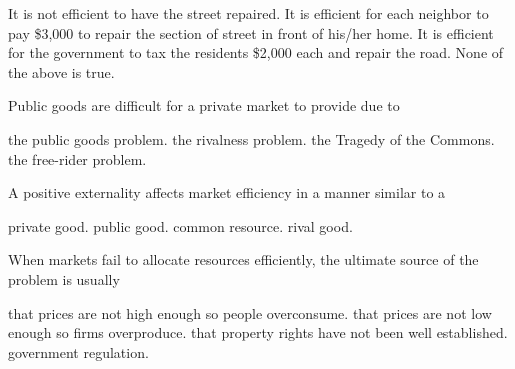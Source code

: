 \documentclass[addpoints,11pt]{exam}
\theoremstyle{definition}
\begin{document}
\begin{questions}
\begin{choices}
	\choice It is not efficient to have the street repaired.
	\choice It is efficient for each neighbor to pay \$3,000 to repair the section of street in front of his/her home.
	\CorrectChoice It is efficient for the government to tax the residents \$2,000 each and repair the road.
	\choice None of the above is true.
\end{choices}

\question Public goods are difficult for a private market to provide due to 

\begin{choices}
	\choice the public goods problem.
	\choice the rivalness problem.
	\choice the Tragedy of the Commons.
	\CorrectChoice the free-rider problem.
\end{choices}

\question A positive externality affects market efficiency in a manner similar to a 

\begin{choices}
	\choice private good.
	\CorrectChoice public good.
	\choice common resource.
	\choice rival good.
\end{choices}

\question When markets fail to allocate resources efficiently, the ultimate source of the problem is usually

\begin{choices}
	\choice that prices are not high enough so people overconsume.
	\choice that prices are not low enough so firms overproduce.
	\CorrectChoice that property rights have not been well established.
	\choice government regulation.
\end{choices}

\end{questions}
\end{document}
